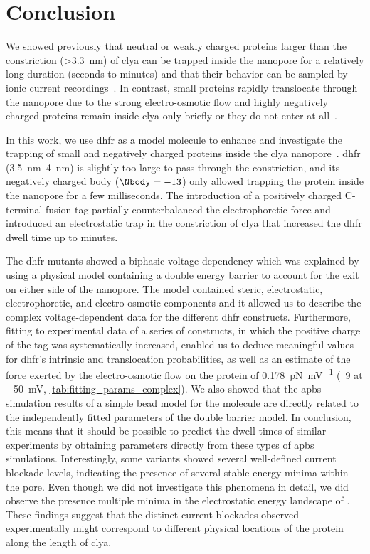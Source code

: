 %
\section{Conclusion}
%
\label{sec:trapping:conclusion}
%
We showed previously that neutral or weakly charged proteins larger than the \transi{} constriction
(\SI{>3.3}{\nm}) of \gls{clya} can be trapped inside the nanopore for a relatively long duration (seconds to
minutes) and that their behavior can be sampled by ionic current recordings~\cite{Soskine-2013,
Soskine-2012,Soskine-Biesemans-2015,Biesemans-2015,VanMeervelt-2014,VanMeervelt-2017,Wloka-2017}. In contrast,
small proteins rapidly translocate through the nanopore due to the strong electro-osmotic flow and highly
negatively charged proteins remain inside \gls{clya} only briefly or they do not enter at
all~\cite{Soskine-2012}.

In this work, we use \gls{dhfr} as a model molecule to enhance and investigate the trapping of small and
negatively charged proteins inside the \gls{clya} nanopore~\cite{Biesemans-2015}. \gls{dhfr}
(\SIrange{3.5}{4}{\nm}) is slightly too large to pass through the \transi{} constriction, and its negatively
charged body ($\Nbody = -13$) only allowed trapping the protein inside the nanopore for a few milliseconds.
The introduction of a positively charged C-terminal fusion tag partially counterbalanced the electrophoretic
force and introduced an electrostatic trap in the \transi{} constriction of \gls{clya} that increased the
\gls{dhfr} dwell time up to minutes.

The \gls{dhfr} mutants showed a biphasic voltage dependency which was explained by using a physical model
containing a double energy barrier to account for the exit on either side of the nanopore. The model contained
steric, electrostatic, electrophoretic, and electro-osmotic components and it allowed us to describe the
complex voltage-dependent data for the different \gls{dhfr} constructs. Furthermore, fitting to experimental
data of a series of  constructs, in which the positive charge of the tag was systematically
increased, enabled us to deduce meaningful values for \gls{dhfr}'s intrinsic \cisi{} and \transi{}
translocation probabilities, as well as an estimate of the force exerted by the electro-osmotic flow on the
protein of \SI{0.178}{\pico\newton\per\milli\volt} (\eg~\SI{9}{\pN} at \SI{-50}{\mV},
\cref{tab:fitting_params_complex}). We also showed that the \gls{apbs} simulation results of a simple bead
model for the molecule are directly related to the independently fitted parameters of the double barrier
model. In conclusion, this means that it should be possible to predict the dwell times of similar experiments
by obtaining parameters directly from these types of \gls{apbs} simulations. Interestingly, some \DHFRt{}
variants showed several well-defined current blockade levels, indicating the presence of several stable energy
minima within the pore. Even though we did not investigate this phenomena in detail, we did observe the
presence multiple minima in the electrostatic energy landscape of \DHFRt{}. These findings suggest that the
distinct current blockades observed experimentally might correspond to different physical locations of the
protein along the length of \gls{clya}.

